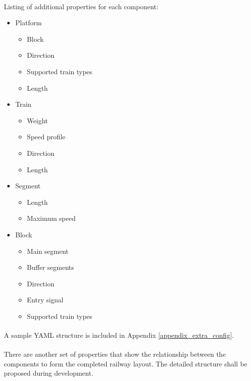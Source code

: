 \documentclass[a4paper,11pt]{scrreprt}
\begin{document}
\paragraph{}Listing of additional properties for each component:
\begin{itemize}
    \item Platform
    \begin{itemize}
        \item Block
        \item Direction
        \item Supported train types
        \item Length
    \end{itemize}
    \item Train
    \begin{itemize}
        \item Weight
        \item Speed profile
        \item Direction
        \item Length
    \end{itemize}
    \item Segment
    \begin{itemize}
        \item Length
        \item Maximum speed
    \end{itemize}
    \item Block
    \begin{itemize}
        \item Main segment
        \item Buffer segments
        \item Direction
        \item Entry signal
        \item Supported train types
    \end{itemize}
\end{itemize}

\paragraph{}A sample YAML structure is included in Appendix \ref{appendix_extra_config}.

\paragraph{}There are another set of properties that show the relationship between the components to form the completed railway layout. The detailed structure shall be proposed during development.
\end{document}
